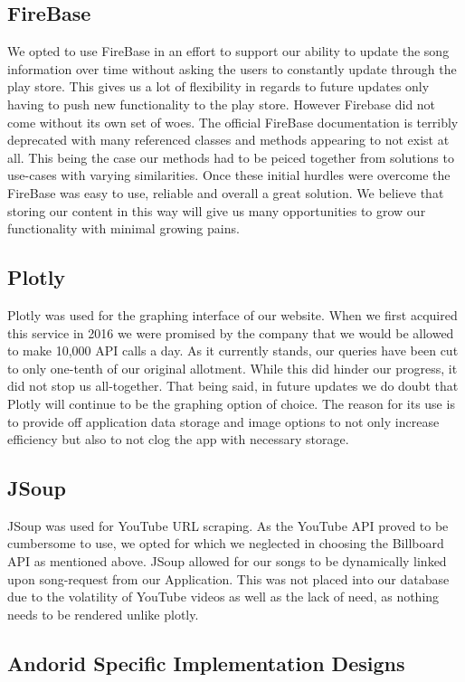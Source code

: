 \documentclass{article}
\begin{document}
\subsection*{FireBase}
We opted to use FireBase in an effort to support our ability to update the song information over time without asking the users to constantly update through the play store. This gives us a lot of flexibility in regards to future updates only having to push new functionality to the play store. However Firebase did not come without its own set of woes. The official FireBase documentation is terribly deprecated with many referenced classes and methods appearing to not exist at all. This being the case our methods had to be peiced together from solutions to use-cases with varying similarities. Once these initial hurdles were overcome the FireBase was easy to use, reliable and overall a great solution. We believe that storing our content in this way will give us many opportunities to grow our functionality with minimal growing pains.  
\subsection*{Plotly}
Plotly was used for the graphing interface of our website.
When we first acquired this service in 2016 we were promised by the company that we would be allowed to make 10,000 API calls a day.
As it currently stands, our queries have been cut to only one-tenth of our original allotment. While this did hinder our progress, it did not stop us all-together. That being said, in future updates we do doubt that Plotly will continue to be the graphing option of choice.
The reason for its use is to provide off application data storage and image options to not only increase efficiency but also to not clog the app with necessary storage.
\subsection*{JSoup}
JSoup was used for YouTube URL scraping.
As the YouTube API proved to be cumbersome to use, we opted for which we neglected in choosing the Billboard API as mentioned above.
JSoup allowed for our songs to be dynamically linked upon song-request from our Application.
This was not placed into our database due to the volatility of YouTube videos as well as the lack of need, as nothing needs to be rendered unlike plotly.
\subsection*{Andorid Specific Implementation Designs}
\end{document}
